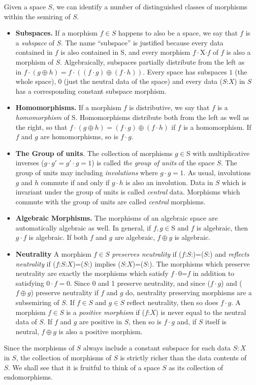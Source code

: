 \documentclass[11pt]{article}
\begin{document}
Given a space $S$, we can identify a number of distinguished classes of morphisms within the semiring of $S$. 
\begin{itemize}

\item{{\bf Subspaces.} If a morphism $f\in S$ happens to also be a space, we say that $f$ is a {\it subspace} of $S$.  The name ``subspace'' is justified because every data contained in $f$ is also contained in S, and every morphism $f\cdot$X$\cdot f$ of $f$ is also a morphism of $S$.  Algebraically, subspaces partially distribute from the left as 
in $f\cdot(g\oplus h)=f\cdot((f\cdot g)\oplus(f\cdot h))$.  Every space has subspaces $1$ (the whole space), $0$ (just the neutral data of the space) and every data ($S$:$X$) in $S$ has a corresponding 
constant subspace morphism.} 

\item{{\bf Homomorphisms.} If a morphism $f$ is distributive, we say that $f$ is a {\it homomorphism} of S.  
Homomorphisms distribute both from the left as well as the right, so that $f\cdot(g\oplus h)=(f\cdot g)\oplus(f\cdot h)$ if $f$ is a homomorphism.  If $f$ and $g$ are 
homomorphisms, so is $f\cdot g$.}

\item {{\bf The Group of units}. The collection of morphisms $g\in$S with multiplicative inverses ($g\cdot g'=g'\cdot g=1$) is called {\it the group of units} of the space $S$.  
The group of units may including {\it involutions} where $g\cdot g=1$.  As usual, involutions $g$ and $h$ commute if and only if $g\cdot h$ is also an involution.  Data in $S$ which is invariant under the group of units is 
called {\it central} data.  Morphisms which commute with the group of units are called {\it central} morphisms.}

\item {{\bf Algebraic Morphisms.} The morphisms of an algebraic space are automatically algebraic as well.  In general, if $f,g\in$S and $f$ is algebraic, then $g\cdot f$ is algebraic.  If both 
$f$ and $g$ are algebraic, $f\oplus g$ is algebraic.}

\item{{\bf Neutrality} A morphism $f\in S$ {\it preserves neutrality} if ($f$:$S$:)=($S$:) and {\it reflects neutrality} if ($f$:$S$:$X$)=($S$:) implies ($S$:$X$)=($S$:). 
The morphisms which preserve neutrality are exactly the morphisms which satisfy $f\cdot 0$=$f$ in addition to satisfying $0\cdot f=0$.  Since 0 and 1 preserve neutrality, 
and since ($f\cdot g$) and ($f\oplus g$) preserve neutrality if $f$ and $g$ do, neutrality preserving morphisms are a subsemiring of $S$.  If $f\in S$ and $g\in S$ reflect neutrality, 
then so does $f\cdot g$.  A morphism $f\in S$ is a {\it positive morphism} if ($f$:$X$) is never equal to the neutral data of $S$.  If $f$ and $g$ are positive in $S$, then so is $f\cdot g$ and, 
if $S$ itself is neutral, $f\oplus g$ is also a positive morphism.}  
\end{itemize} 
Since the morphisms of $S$ always include a constant subspace for each data $S:X$ in $S$, the collection of morphisms of $S$ is strictly richer 
than the data contents of $S$.  We shall see that it is fruitful to think of a space $S$ as its collection of endomorphisms. 
\end{document}
